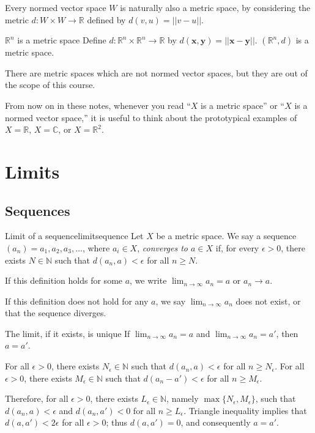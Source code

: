 Every normed vector space \(W\) is naturally also a metric space, by considering the metric \(d: W \times W \to \mathbb{R}\) defined by \(d(v, u) = ||v - u||\).

\begin{exmp}{\(\mathbb{R}^n\) is a metric space}{}
	Define \(d \colon \mathbb{R}^n \times \mathbb{R}^n \to \mathbb{R}\) by \(d(\mathbf x, \mathbf y) = ||\mathbf x - \mathbf y||\). \((\mathbb{R}^n, d)\) is a metric space.
\end{exmp}

There are metric spaces which are not normed vector spaces, but they are out of the scope of this course.

From now on in these notes, whenever you read ``\(X\) is a metric space'' or ``\(X\) is a normed vector space,'' it is useful to think about the prototypical examples of \(X = \mathbb{R}\), \(X = \mathbb{C}\), or \(X = \mathbb{R}^2\). 

\chapter{Limits}

\section{Sequences}

\begin{defn}{Limit of a sequence}{limitsequence}
	Let \(X\) be a metric space.
	We say a sequence \((a_n) = a_1, a_2, a_3, \dots\), where \(a_i \in X\), \emph{converges to \(a \in X\)} if, for every \(\epsilon > 0\), there exists \(N \in \mathbb{N}\) such that \(d(a_n, a) < \epsilon\) for all \(n \geq N\).

	If this definition holds for some \(a\), we write \(\lim_{n\to\infty} a_n = a\) or \(a_n \to a\).

	If this definition does not hold for any \(a\), we say \(\lim_{n\to\infty} a_n\) does not exist, or that the sequence diverges.
\end{defn}

\begin{prop}{The limit, if it exists, is unique}{}
	If  \(\lim_{n\to\infty} a_n = a\) and  \(\lim_{n\to\infty} a_n = a'\), then \(a = a'\).
\end{prop}

\begin{dem}{}{}
	For all \(\epsilon > 0\), there exists \(N_\epsilon \in \mathbb{N}\) such that \( d(a_n, a) <\epsilon\) for all  \(n \geq N_\epsilon\).
	For all \(\epsilon > 0\), there exists \(M_\epsilon \in \mathbb{N}\) such that \( d(a_n - a') <\epsilon\) for all  \(n \geq M_\epsilon\).

	Therefore, for all \(\epsilon > 0\), there exists \(L_\epsilon \in \mathbb{N}\), namely \(\max\{N_\epsilon, M_\epsilon\}\), such that  \(d(a_n, a) < \epsilon\) and  \(d(a_n, a') < 0\) for all  \(n \geq L_\epsilon\). Triangle inequality implies that \(d(a, a') < 2\epsilon\) for all \(\epsilon > 0\); thus \(d(a, a') = 0\), and consequently \(a = a'\).
\end{dem}

